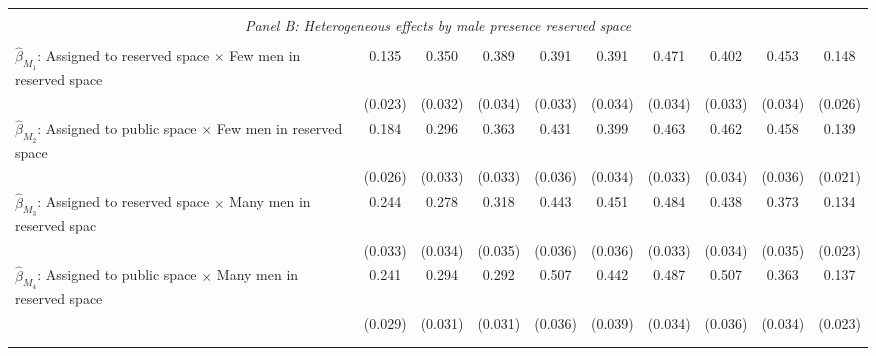 \begin{tabular}{l*{9}{c}}
\hline \\[-1ex] \multicolumn{10}{c}{\textit{Panel B: Heterogeneous effects by male presence reserved space}} \\\\[-1ex]
$\hat\beta_{M_1}$: Assigned to reserved space $\times$ Few men in reserved space&       0.135\sym{***}&       0.350\sym{***}&       0.389\sym{***}&       0.391\sym{***}&       0.391\sym{***}&       0.471\sym{***}&       0.402\sym{***}&       0.453\sym{***}&       0.148\sym{***}\\
                    &     (0.023)         &     (0.032)         &     (0.034)         &     (0.033)         &     (0.034)         &     (0.034)         &     (0.033)         &     (0.034)         &     (0.026)         \\
[1em]
$\hat\beta_{M_2}$: Assigned to public space $\times$ Few men in reserved space&       0.184\sym{***}&       0.296\sym{***}&       0.363\sym{***}&       0.431\sym{***}&       0.399\sym{***}&       0.463\sym{***}&       0.462\sym{***}&       0.458\sym{***}&       0.139\sym{***}\\
                    &     (0.026)         &     (0.033)         &     (0.033)         &     (0.036)         &     (0.034)         &     (0.033)         &     (0.034)         &     (0.036)         &     (0.021)         \\
[1em]
$\hat\beta_{M_3}$: Assigned to reserved space $\times$ Many men in reserved spac&       0.244\sym{***}&       0.278\sym{***}&       0.318\sym{***}&       0.443\sym{***}&       0.451\sym{***}&       0.484\sym{***}&       0.438\sym{***}&       0.373\sym{***}&       0.134\sym{***}\\
                    &     (0.033)         &     (0.034)         &     (0.035)         &     (0.036)         &     (0.036)         &     (0.033)         &     (0.034)         &     (0.035)         &     (0.023)         \\
[1em]
$\hat\beta_{M_4}$: Assigned to public space $\times$ Many men in reserved space&       0.241\sym{***}&       0.294\sym{***}&       0.292\sym{***}&       0.507\sym{***}&       0.442\sym{***}&       0.487\sym{***}&       0.507\sym{***}&       0.363\sym{***}&       0.137\sym{***}\\
                    &     (0.029)         &     (0.031)         &     (0.031)         &     (0.036)         &     (0.039)         &     (0.034)         &     (0.036)         &     (0.034)         &     (0.023)         \\
\\[-1.8ex] \hline \\[-1.8ex]  

\end{tabular}
